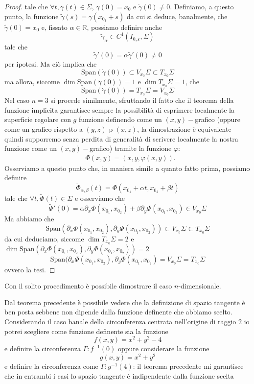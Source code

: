\documentclass[openany, italian]{book}
\begin{document}
\begin{proof}
tale che $\forall t, \gamma(t) \in \Sigma$, $\gamma(0) = x_0$ e $\dot{\gamma}(0) \neq 0$. Definiamo, a questo punto, la funzione $\tilde{\gamma}(s) = \gamma(x_{0_1} + s)$ da cui si deduce, banalmente, che $\tilde{\gamma}(0) = x_0$ e, fissato $\alpha \in \mathbb{R}$, possiamo definire anche
$$
\tilde{\gamma}_\alpha \in C^{1}(I_{0, \varepsilon}, \Sigma)
$$
tale che
$$
\tilde{\gamma}'(0) = \alpha \tilde{\gamma}'(0) \neq 0 
$$
per ipotesi. Ma ciò implica che
$$
\text{Span}(\dot{\gamma}(0)) \subset V_{x_0} \Sigma \subset T_{x_0} \Sigma
$$
ma allora, siccome $\dim{\text{Span}(\dot{\gamma}(0))} = 1$ e $\dim{T_{x_0} \Sigma} = 1$, che
$$
\text{Span}(\dot{\gamma}(0)) = T_{x_0} \Sigma = V_{x_0} \Sigma
$$
Nel caso $n=3$ si procede similmente, sfruttando il fatto che il teorema della funzione implicita garantisce sempre la possibilità di esprimere localmente la superficie regolare con $g$ funzione definendo come un $(x, y)-$grafico (oppure come un grafico rispetto a $(y, z)$ p $(x, z)$, la dimostrazione è equivalente quindi supporremo senza perdita di generalità di scrivere localmente la nostra funzione come un $(x, y)-$grafico) tramite la funzione $\varphi$:
\begin{align*}
&\Phi(x, y) = (x, y, \varphi(x, y)).
\end{align*}
Osserviamo a questo punto che, in maniera simile a quanto fatto prima, possiamo definire
$$
\tilde{\Phi}_{\alpha, \beta}(t) = \Phi(x_{0_1} + \alpha t, x_{0_2} + \beta t)
$$
tale che $\forall t, \tilde{\Phi}(t) \in \Sigma$ e osserviamo che
$$
\tilde{\Phi}'(0) = \alpha \partial_x \Phi(x_{0_1}, x_{0_2}) + \beta \partial_y \Phi(x_{0_1}, x_{0_2}) \in V_{x_0} \Sigma
$$
Ma abbiamo che 
$$
\text{Span}(\partial_x \Phi(x_{0_1}, x_{0_2}), \partial_y \Phi(x_{0_1}, x_{0_2})) \subset V_{x_0} \Sigma \subset T_{x_0} \Sigma
$$
da cui deduciamo, siccome $\dim{T_{x_0} \Sigma} = 2$ e $\dim{\text{Span}(\partial_{x} \Phi(x_{0_1}, x_{0_2}), \partial_y \Phi(x_{0_1}, x_{0_2}))} = 2$
$$
	\text{Span}(\partial_x \Phi(x_{0_1}, x_{0_2}), \partial_y \Phi(x_{0_1}, x_{0_2}) = V_{x_0} \Sigma = T_{x_0} \Sigma
$$
ovvero la tesi.
\end{proof}
\begin{remark}
Con il solito procedimento è possibile dimostrare il caso $n$-dimensionale.
\end{remark}
\begin{remark}
Dal teorema precedente è possibile vedere che la definizione di spazio tangente è ben posta sebbene non dipende dalla funzione definente che abbiamo scelto. Considerando il caso banale della circonferenza centrata nell'origine di raggio $2$ io potrei scegliere come funzione definente sia la funzione
$$
f(x, y) = x^2 + y^2 - 4
$$
e definire la circonferenza $\Gamma: f^{-1}(0)$ oppure considerare la funzione
$$
g(x, y) = x^2 + y^2
$$
e definire la circonferenza come $\Gamma: g^{-1}(4)$: il teorema precedente mi garantisce che in entrambi i casi lo spazio tangente è indipendente dalla funzione scelta
\end{remark}
\end{document}
